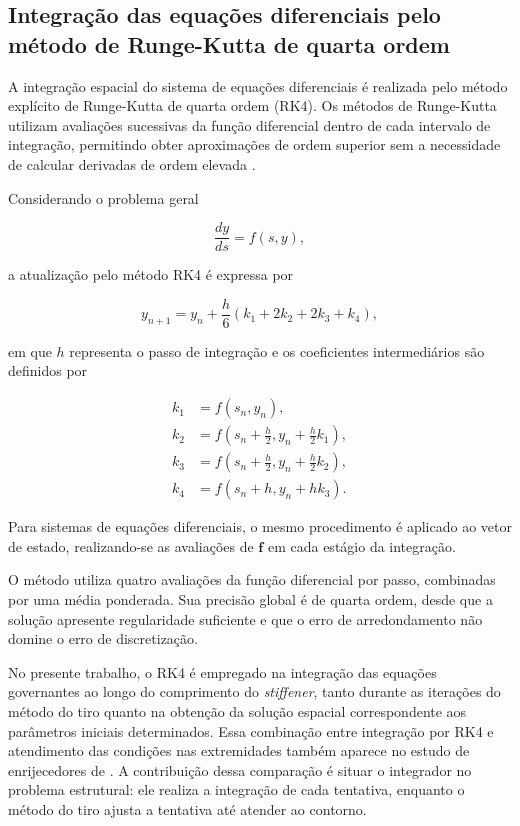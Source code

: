 \documentclass[arial,centeredequations,english,brazilian,oneside,section=TITLE]{ifes8}
\begin{document}
\subsection{Integração das equações diferenciais pelo método de
Runge-Kutta de quarta ordem}
\label{subsec:runge-kutta}

A integração espacial do sistema de equações diferenciais é
realizada pelo método explícito de Runge-Kutta de quarta ordem
(RK4). Os métodos de Runge-Kutta utilizam avaliações sucessivas da função
diferencial dentro de cada intervalo de integração, permitindo
obter aproximações de ordem superior sem a necessidade de calcular
derivadas de ordem elevada \cite{Chapra2011}.

Considerando o problema geral

\begin{equation}
  \frac{dy}{ds}=f(s,y),
  \label{eq:edo-escalar-rk}
\end{equation}

a atualização pelo método RK4 é expressa por

\begin{equation}
  y_{n+1}
  =
  y_n +
  \frac{h}{6}
  \left(k_1+2k_2+2k_3+k_4\right),
  \label{eq:rk4-atualizacao}
\end{equation}

em que $h$ representa o passo de integração e os coeficientes
intermediários são definidos por

\begin{align}
  k_1 &= f(s_n,y_n), \\
  k_2 &= f\left(s_n+\frac{h}{2},
                y_n+\frac{h}{2}k_1\right), \\
  k_3 &= f\left(s_n+\frac{h}{2},
                y_n+\frac{h}{2}k_2\right), \\
  k_4 &= f(s_n+h,y_n+hk_3).
\end{align}

Para sistemas de equações diferenciais, o mesmo procedimento é
aplicado ao vetor de estado, realizando-se as avaliações de
$\mathbf{f}$ em cada estágio da integração.

O método utiliza quatro avaliações da função diferencial por
passo, combinadas por uma média ponderada. Sua precisão global é
de quarta ordem, desde que a solução apresente regularidade
suficiente e que o erro de arredondamento não domine o erro de
discretização.

No presente trabalho, o RK4 é empregado na integração das equações
governantes ao longo do comprimento do \textit{stiffener}, tanto
durante as iterações do método do tiro quanto na obtenção da
solução espacial correspondente aos parâmetros iniciais
determinados. Essa combinação entre integração por RK4 e atendimento das condições
nas extremidades também aparece no estudo de enrijecedores de
. A contribuição dessa comparação é situar o integrador no
problema estrutural: ele realiza a integração de cada tentativa, enquanto o
método do tiro ajusta a tentativa até atender ao contorno.
\end{document}
